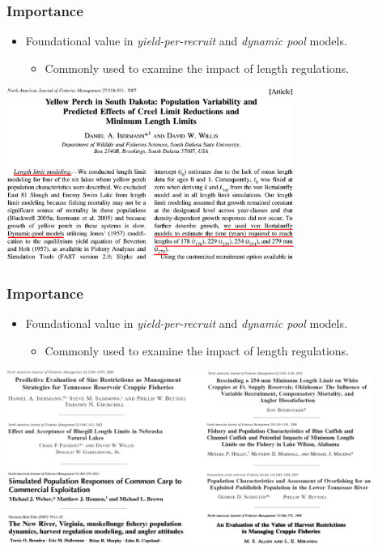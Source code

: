 \documentclass[xcolor=dvipsnames,t]{beamer}\usepackage[]{graphicx}\usepackage[]{color}
\begin{document}
\begin{frame}[fragile]
\frametitle{Importance}
\begin{itemize}
  \item Foundational value in \textit{yield-per-recruit} and \textit{dynamic pool} models.
  \begin{itemize}
    \item Commonly used to examine the impact of length regulations.
  \end{itemize}
\end{itemize}
\pause
\begin{center}
\includegraphics[width=3.7in]{Figs/Isermann-etal-2007.jpg}
\end{center}
\end{frame}


\begin{frame}[fragile]
\frametitle{Importance}
\begin{itemize}
  \item Foundational value in \textit{yield-per-recruit} and \textit{dynamic pool} models.
  \begin{itemize}
    \item Commonly used to examine the impact of length regulations.
  \end{itemize}
\end{itemize}

\smallskip

\begin{center}
\includegraphics[width=4.7in]{Figs/tr-examples.jpg}
\end{center}
\end{frame}
\end{document}
